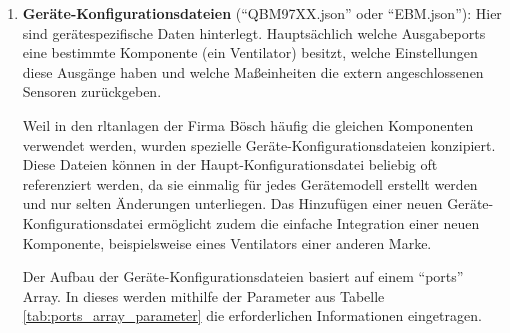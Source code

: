 \begin{enumerate}
	\item \textbf{Geräte-Konfigurationsdateien} (\zB \enquote{QBM97XX.json} oder \enquote{EBM.json}): Hier sind gerätespezifische Daten hinterlegt. Hauptsächlich welche Ausgabeports eine bestimmte Komponente (\zB ein Ventilator) besitzt, welche Einstellungen diese Ausgänge haben und \ggf welche Maßeinheiten die extern angeschlossenen Sensoren zurückgeben. 
	
	Weil in den \acs{rltanlagen} der Firma Bösch häufig die gleichen Komponenten verwendet werden, wurden spezielle Geräte-Konfigurationsdateien konzipiert. Diese Dateien können in der Haupt-Konfigurationsdatei beliebig oft referenziert werden, da sie einmalig für jedes Gerätemodell erstellt werden und nur selten Änderungen unterliegen. Das Hinzufügen einer neuen Geräte-Konfigurationsdatei ermöglicht zudem die einfache Integration einer neuen Komponente, beispielsweise eines Ventilators einer anderen Marke.
	
	Der Aufbau der Geräte-Konfigurationsdateien basiert auf einem \enquote{ports} Array. In dieses werden mithilfe der Parameter aus Tabelle \ref{tab:ports_array_parameter} die erforderlichen Informationen eingetragen.
	

\end{enumerate}
